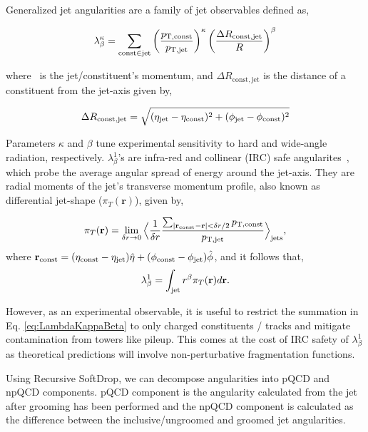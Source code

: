 Generalized jet angularities are a family of jet observables defined as,

\begin{equation}\label{eq:LambdaKappaBeta}
	\lambda_\beta^\kappa=\sum_{\mathrm{const} \in \mathrm{jet}}\left(\frac{p_{\rm T, const }}{p_ {\rm T,  jet}}\right)^\kappa \left(\frac{\Delta R_\mathrm{const, jet}}{R}\right)^\beta
\end{equation}

where ~is the jet/constituent's momentum, and \(\Delta R_\mathrm{const, jet}\) is the \etaphi distance of a constituent from the jet-axis given by, 

\begin{equation}
		\Delta R_\mathrm{const, jet} = \sqrt{(\eta_{\rm jet}-\eta_{\rm const})^2 + (\phi_{\rm jet}-\phi_{\rm const})^2}
\end{equation}

Parameters $\kappa$ and $\beta$ tune experimental sensitivity to hard and wide-angle radiation, respectively. $\lambda^1_\beta$'s are infra-red and collinear (IRC) safe angularites~\cite{Larkoski_2014}, which probe the average angular spread of energy around the jet-axis. They are radial moments of the  jet's transverse momentum profile, also known as differential jet-shape (\(\pi_T(\mathbf{r})\)), given by,

\begin{equation}\label{eq:RhoRIntro}
	\pi_T(\mathbf{r}) = \lim_{\delta r \rightarrow0}\Big\langle\frac{1}{\delta r}\frac{\sum_{|\mathbf{r_{\rm const}} - \mathbf{r}|<\delta r/2}p_{\rm T, const}}{p_{\rm T,  jet}}\Big\rangle _{\rm jets} ,
\end{equation}
where  $\mathbf{r}_{\rm const} =  (\eta_{\rm const}-\eta_{\rm jet})\hat{\eta}+ (\phi_{\rm const}-\phi_{\rm jet})\hat{\phi}$, and it follows that, 
\begin{equation}
	\lambda_\beta^1 = \int_{\rm jet} r^\beta\pi_T(\mathbf{r}) d\mathbf{r} .
\end{equation} 

However, as an experimental observable, it is useful to restrict the summation in Eq. \ref{eq:LambdaKappaBeta} to only charged constituents / tracks and mitigate contamination from towers like pileup.  This comes at the cost of IRC safety of \(\lambda_\beta^1\) as theoretical predictions will involve non-perturbative fragmentation functions. 

Using Recursive SoftDrop, we can decompose angularities into pQCD and npQCD components. pQCD component is the angularity calculated from the jet after grooming has been performed and the npQCD component is calculated as the difference between the inclusive/ungroomed and groomed jet angularities. 

